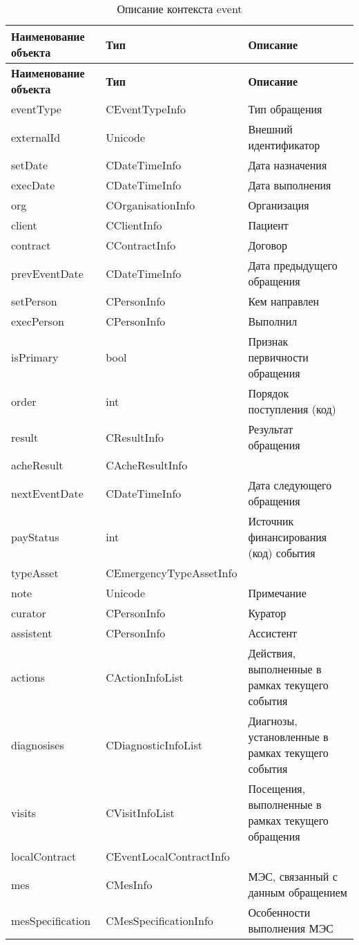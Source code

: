{\small
\begin{longtable}{|p{4cm}|p{5cm}|p{7.6cm}|}
\caption{Описание контекста event \label{tbl_patt_prn_ev}} \\
\hline \rule{0pt}{15pt} \centering \textbf{Наименование объекта} & \centering \textbf{Тип} & \hfil \textbf{Описание} \\ \hline
\endfirsthead
\hline \rule{0pt}{15pt} \centering \textbf{Наименование объекта} & \centering \textbf{Тип} & \hfil \textbf{Описание} \\ \hline
\endhead
eventType &	CEventTypeInfo	& Тип обращения \\ \hline
externalId	& Unicode	& Внешний идентификатор \\ \hline
setDate	& CDateTimeInfo	& Дата назначения \\ \hline
execDate	& CDateTimeInfo	& Дата выполнения \\ \hline
org	& COrganisationInfo	& Организация \\ \hline
client	& CClientInfo	& Пациент \\ \hline
contract	& CContractInfo	& Договор \\ \hline
prevEventDate	& CDateTimeInfo	& Дата предыдущего обращения \\ \hline
setPerson	& CPersonInfo	& Кем направлен \\ \hline
execPerson	& CPersonInfo	& Выполнил \\ \hline
isPrimary	& bool	& Признак первичности обращения \\ \hline
order	& int	& Порядок поступления (код) \\ \hline
result	& CResultInfo	& Результат обращения \\ \hline
acheResult	& CAcheResultInfo &  \\ \hline 	
nextEventDate	& CDateTimeInfo	& Дата следующего обращения \\ \hline
payStatus	& int	& Источник финансирования (код) события \\ \hline
typeAsset	& CEmergencyTypeAssetInfo &  \\ \hline	
note	& Unicode	& Примечание \\ \hline
curator	& CPersonInfo	& Куратор \\ \hline
assistent &	CPersonInfo	& Ассистент \\ \hline
actions	& CActionInfoList &	Действия, выполненные в рамках текущего события \\ \hline
diagnosises	& CDiagnosticInfoList &	Диагнозы, установленные в рамках текущего события \\ \hline
visits	& CVisitInfoList	& Посещения, выполненные в рамках текущего обращения \\ \hline
localContract	& CEventLocalContractInfo &  \\ \hline	
mes	& CMesInfo	& МЭС, связанный с данным обращением \\ \hline
mesSpecification &	CMesSpecificationInfo &	Особенности выполнения МЭС \\ \hline
\end{longtable}
}

